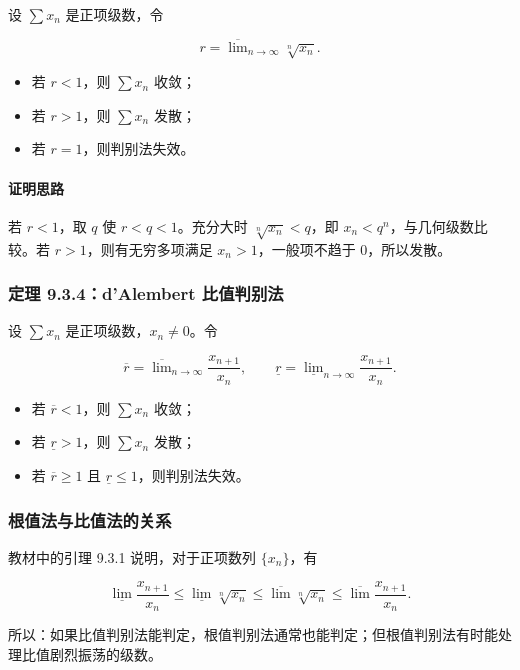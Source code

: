 设 \(\sum x_n\) 是正项级数，令

\[
      r=\overline{\lim}_{n\to\infty}\sqrt[n]{x_n}.
    \]

\begin{itemize}
 \item 若 \(r<1\)，则 \(\sum x_n\) 收敛；
 \item 若 \(r>1\)，则 \(\sum x_n\) 发散；
 \item 若 \(r=1\)，则判别法失效。
 \end{itemize}

\paragraph*{证明思路}

若 \(r<1\)，取 \(q\) 使 \(r<q<1\)。充分大时 \(\sqrt[n]{x_n}<q\)，即 \(x_n<q^n\)，与几何级数比较。若 \(r>1\)，则有无穷多项满足 \(x_n>1\)，一般项不趋于 \(0\)，所以发散。

\subsubsection*{定理 9.3.4：d'Alembert 比值判别法}

设 \(\sum x_n\) 是正项级数，\(x_n\ne0\)。令

\[
      \overline r=\overline{\lim}_{n\to\infty}\frac{x_{n+1}}{x_n},
      \qquad
      \underline r=\underline{\lim}_{n\to\infty}\frac{x_{n+1}}{x_n}.
    \]

\begin{itemize}
 \item 若 \(\overline r<1\)，则 \(\sum x_n\) 收敛；
 \item 若 \(\underline r>1\)，则 \(\sum x_n\) 发散；
 \item 若 \(\overline r\ge1\) 且 \(\underline r\le1\)，则判别法失效。
 \end{itemize}

\subsubsection*{根值法与比值法的关系}

教材中的引理 9.3.1 说明，对于正项数列 \(\{x_n\}\)，有

\[
      \underline{\lim}\frac{x_{n+1}}{x_n}
      \le
      \underline{\lim}\sqrt[n]{x_n}
      \le
      \overline{\lim}\sqrt[n]{x_n}
      \le
      \overline{\lim}\frac{x_{n+1}}{x_n}.
    \]

所以：如果比值判别法能判定，根值判别法通常也能判定；但根值判别法有时能处理比值剧烈振荡的级数。

